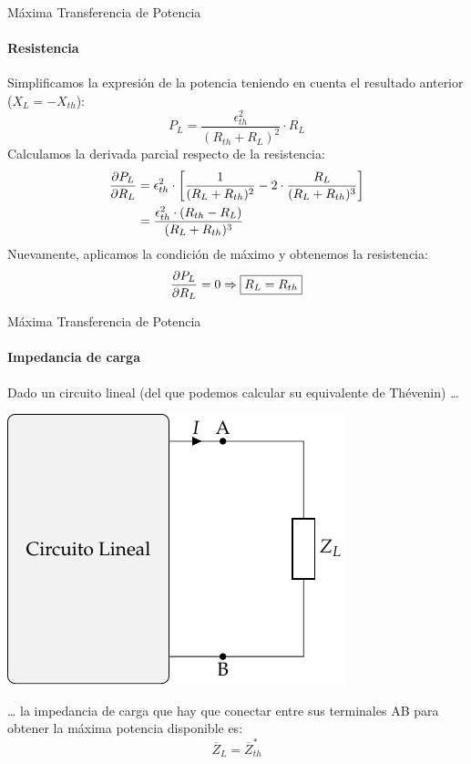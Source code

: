 \documentclass[aspectratio=169, usenames,svgnames,dvipsnames]{beamer}
\begin{document}
\begin{frame}[label={sec:org4e6dfd0}]{Máxima Transferencia de Potencia}
\framesubtitle{Resistencia}
Simplificamos la expresión de la potencia teniendo en cuenta el resultado anterior (\(X_L = - X_{th}\)):
\[
  P_L = \frac{\epsilon^2_{th}}{(R_{th} + R_L)^2} \cdot R_L
\]
Calculamos la derivada parcial respecto de la resistencia:
\begin{align*}
  \diffp{P_L}{R_L} &= \epsilon^2_{th} \cdot \left[\frac{1}{(R_L + R_{th})^2} - 2 \cdot \frac{R_L}{(R_L + R_{th})^3}\right]\\
		   &= \frac{\epsilon^2_{th} \cdot (R_{th} - R_L)}{(R_L + R_{th})^3}
\end{align*}
Nuevamente, aplicamos la condición de máximo y obtenemos la resistencia:
\[
   \diffp{P_L}{R_L} = 0 \Rightarrow \boxed{R_L = R_{th}}
\]
\end{frame}

\begin{frame}[label={sec:orgc4e9dfe}]{Máxima Transferencia de Potencia}
\framesubtitle{Impedancia de carga}

Dado un circuito lineal (del que podemos calcular su equivalente de Thévenin) \ldots{}
\begin{center}
\includegraphics[height=0.45\textheight]{../figs/CircuitoLineal_ZL.pdf}
\end{center}

\ldots{} la impedancia de carga que hay que conectar entre sus terminales AB para obtener la máxima potencia disponible es:
\[
  \boxed{\overline{Z}_L = \overline{Z}_{th}^*}
\]
\end{frame}
\end{document}
